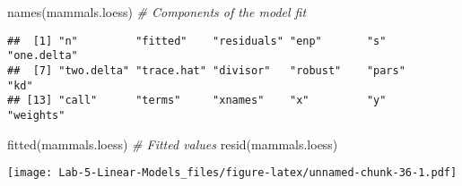\documentclass[
]{article}
\newenvironment{Shaded}{\begin{snugshade}}{\end{snugshade}}
\newcommand{\AttributeTok}[1]{\textcolor[rgb]{0.77,0.63,0.00}{#1}}
\newcommand{\CommentTok}[1]{\textcolor[rgb]{0.56,0.35,0.01}{\textit{#1}}}
\newcommand{\DecValTok}[1]{\textcolor[rgb]{0.00,0.00,0.81}{#1}}
\newcommand{\FunctionTok}[1]{\textcolor[rgb]{0.00,0.00,0.00}{#1}}
\newcommand{\NormalTok}[1]{#1}
\newcommand{\SpecialCharTok}[1]{\textcolor[rgb]{0.00,0.00,0.00}{#1}}
\begin{document}
\begin{Shaded}
\begin{Highlighting}[]
\FunctionTok{names}\NormalTok{(mammals.loess)    }\CommentTok{\# Components of the model fit}
\end{Highlighting}
\end{Shaded}

\begin{verbatim}
##  [1] "n"         "fitted"    "residuals" "enp"       "s"         "one.delta"
##  [7] "two.delta" "trace.hat" "divisor"   "robust"    "pars"      "kd"       
## [13] "call"      "terms"     "xnames"    "x"         "y"         "weights"
\end{verbatim}

\begin{Shaded}
\begin{Highlighting}[]
\FunctionTok{fitted}\NormalTok{(mammals.loess)   }\CommentTok{\# Fitted values}
\FunctionTok{resid}\NormalTok{(mammals.loess)}
\end{Highlighting}
\end{Shaded}

\begin{Shaded}
\end{Shaded}

\texttt{[image: Lab-5-Linear-Models\_files/figure-latex/unnamed-chunk-36-1.pdf]}

\begin{Shaded}
\end{Shaded}
\end{document}
